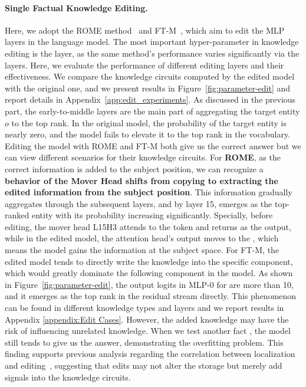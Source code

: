 \paragraph{Single Factual Knowledge Editing.}
\label{parameter edit}
Here, we adopt the ROME method~\cite{meng2022locating} and FT-M~\cite{knowledge_editing_survey_2}, which aim to edit the MLP layers in the language model.
The most important hyper-parameter in knowledge editing is the layer, as the same method's performance varies significantly via the layers.
Here, we evaluate the performance of different editing layers and their effectiveness.
We compare the knowledge circuits computed by the edited model with the original one, and we present results in Figure~\ref{fig:parameter-edit} and report details in Appendix~\ref{app:edit_experiments}.
As discussed in the previous part, the early-to-middle layers are the main part of aggregating the target entity $o$ to the top rank.
In the original model, the probability of the target entity  is nearly zero, and the model fails to elevate it to the top rank in the vocabulary.
Editing the model with ROME and FT-M both give us the correct answer but we can view different scenarios for their knowledge circuits.
For \textbf{ROME}, as the correct information is added to the subject position, we can recognize a \textbf{behavior of the Mover Head shifts from copying to extracting the edited information from the subject position}.
This information gradually aggregates through the subsequent layers, and by layer 15,  emerges as the top-ranked entity with its probability increasing significantly.
Specially, before editing, the mover head L15H3 attends to the  token and returns  as the output, while in the edited model, the attention head's output moves to the , which means the model gains the information at the subject space.
For FT-M, the edited model tends to directly write the knowledge into the specific component, which would greatly dominate the following component in the model.
As shown in Figure~\ref{fig:parameter-edit}, the output logits in MLP-0 for  are more than 10, and it emerges as the top rank in the residual stream directly. 
This phenomenon can be found in different knowledge types and layers and we report results in Appendix \ref{appendix:Edit Cases}.
However, the added knowledge may have the risk of influencing unrelated knowledge.
When we test another fact , the model still tends to give us the  answer, demonstrating the overfitting problem.
This finding supports previous analysis regarding the correlation between localization and editing~\cite{hase2023does}, suggesting that edits may not alter the storage but merely add signals into the knowledge circuits.

